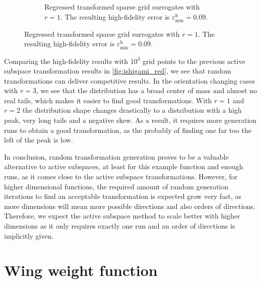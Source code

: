 \documentclass[
  a4paper,  %
  twoside,  %
  bibliography=totoc,
  headsepline,
  cleardoublepage=empty,
  parskip=half,
  draft=false
]{scrbook}
\begin{document}
\begin{mdframed}[style=style]
\begin{figure}[H]
\begin{subfigure}{.5\textwidth}
  \caption{Regressed transformed sparse grid surrogates with $r=1$. The resulting high-fidelity error is $\varepsilon^\mathrm{h}_{\mathrm{min}}=0.09$.}
\vspace{3mm}
\label{fig:ishigami_hist_1}
\end{subfigure}
\delimit
\label{fig:ishigami_hists}
\end{figure}
\end{mdframed}
%
Comparing the high-fidelity results with $10^3$ grid points to the previous active subspace transformation results in \cref{fig:ishigami_red}, we see that random transformations can deliver competitive results.
In the orientation changing cases with $r=3$, we see that the distribution has a broad center of mass and almost no real tails, which makes it easier to find good transformations.
With $r=1$ and $r=2$ the distribution shape changes drastically to a distribution with a high peak, very long tails and a negative skew.
As a result, it requires more generation runs to obtain a good transformation, as the probably of finding one far too the left of the peak is low.

In conclusion, random transformation generation proves to be a valuable alternative to active subspaces, at least for this example function and enough runs, as it comes close to the active subspace transformations.
However, for higher dimensional functions, the required amount of random generation iterations to find an acceptable transformation is expected grow very fast, as more dimensions will mean more possible directions and also orders of directions.
Therefore, we expect the active subspace method to scale better with higher dimensions as it only requires exactly one run and an order of directions is implicitly given.

\newpage
\section{Wing weight function}
\end{document}
